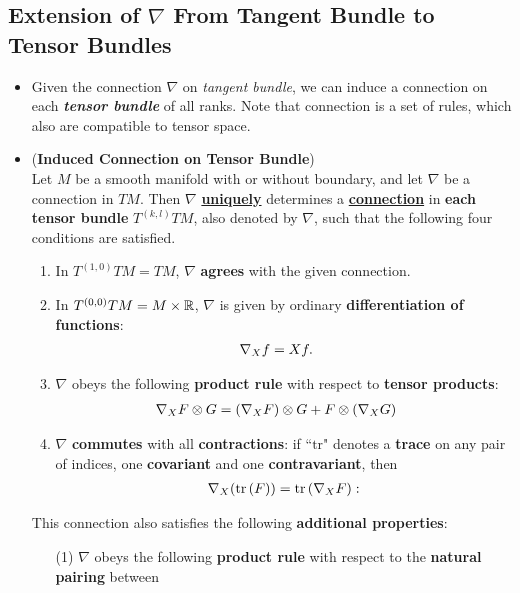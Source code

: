 \documentclass[11pt]{article}
\begin{document}
\subsection{Extension of $\nabla$ From Tangent Bundle to Tensor Bundles}
\begin{itemize}
\item \begin{remark}
Given the connection $\nabla$ on \emph{tangent bundle}, we can induce a connection on each \emph{\textbf{tensor bundle}} of all ranks. Note that connection is a set of rules, which also are compatible to tensor space.
\end{remark}

\item \begin{proposition} (\textbf{Induced Connection on Tensor Bundle})\\
Let $M$ be a smooth manifold with or without boundary, and let $\nabla$ be a connection in $TM$. Then $\nabla$ \underline{\textbf{uniquely}} determines a \underline{\textbf{connection}} in \textbf{each tensor bundle} $T^{(k,l)}TM$, also denoted by $\nabla$, such that the following four conditions are satisfied.
\begin{enumerate}
\item In $T^{(1,0)}TM = TM$,  $\nabla$ \textbf{agrees} with the given connection.
\item In $T^{(0,0)}TM = M \times {\mathbb R}$, $\nabla$ is given by ordinary \textbf{differentiation of functions}:
\begin{align*}
\nabla_{X}{f} &= Xf.
\end{align*}
\item $\nabla$ obeys the following \textbf{product rule} with respect to \textbf{tensor products}:
\begin{align*}
\nabla_{X}{F\otimes G} &= (\nabla_{X}{F}) \otimes G +  F \otimes (\nabla_{X}{G})
\end{align*}
\item $\nabla$ \textbf{commutes} with all \textbf{contractions}: if ``$\text{tr}$" denotes a \textbf{trace} on any pair of indices, one \textbf{covariant} and one \textbf{contravariant}, then
\begin{align*}
\nabla_{X}{(\mathrm{tr}\left(F \right))} = \mathrm{tr}\left(\nabla_{X}{F} \right):
\end{align*}
\end{enumerate}
This connection also satisfies the following \textbf{additional properties}:
\begin{enumerate}
\item[(1)] $\nabla$ obeys the following \textbf{product rule} with respect to the \textbf{natural pairing} between

\end{enumerate}
\end{proposition}
\end{itemize}
\end{document}
